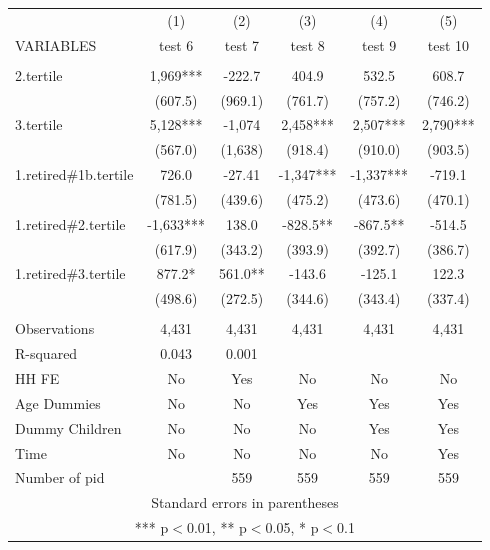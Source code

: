 \begin{tabular}{lccccc} \hline
 & (1) & (2) & (3) & (4) & (5) \\
VARIABLES & test 6 & test 7 & test 8 & test 9 & test 10 \\ \hline
 &  &  &  &  &  \\
2.tertile & 1,969*** & -222.7 & 404.9 & 532.5 & 608.7 \\
 & (607.5) & (969.1) & (761.7) & (757.2) & (746.2) \\
3.tertile & 5,128*** & -1,074 & 2,458*** & 2,507*** & 2,790*** \\
 & (567.0) & (1,638) & (918.4) & (910.0) & (903.5) \\
1.retired\#1b.tertile & 726.0 & -27.41 & -1,347*** & -1,337*** & -719.1 \\
 & (781.5) & (439.6) & (475.2) & (473.6) & (470.1) \\
1.retired\#2.tertile & -1,633*** & 138.0 & -828.5** & -867.5** & -514.5 \\
 & (617.9) & (343.2) & (393.9) & (392.7) & (386.7) \\
1.retired\#3.tertile & 877.2* & 561.0** & -143.6 & -125.1 & 122.3 \\
 & (498.6) & (272.5) & (344.6) & (343.4) & (337.4) \\
 &  &  &  &  &  \\
Observations & 4,431 & 4,431 & 4,431 & 4,431 & 4,431 \\
R-squared & 0.043 & 0.001 &  &  &  \\
HH FE & No & Yes & No & No & No \\
Age Dummies & No & No & Yes & Yes & Yes \\
Dummy Children & No & No & No & Yes & Yes \\
Time & No & No & No & No & Yes \\
 Number of pid &  & 559 & 559 & 559 & 559 \\ \hline
\multicolumn{6}{c}{ Standard errors in parentheses} \\
\multicolumn{6}{c}{ *** p$<$0.01, ** p$<$0.05, * p$<$0.1} \\
\end{tabular}
